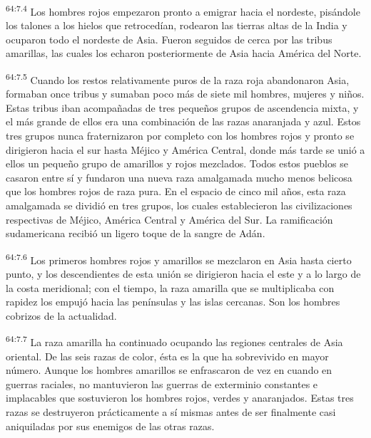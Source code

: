 \par
\textsuperscript{64:7.4} Los hombres rojos empezaron pronto a emigrar hacia el nordeste, pisándole los talones a los hielos que retrocedían, rodearon las tierras altas de la India y ocuparon todo el nordeste de Asia. Fueron seguidos de cerca por las tribus amarillas, las cuales los echaron posteriormente de Asia hacia América del Norte.

\par
\textsuperscript{64:7.5} Cuando los restos relativamente puros de la raza roja abandonaron Asia, formaban once tribus y sumaban poco más de siete mil hombres, mujeres y niños. Estas tribus iban acompañadas de tres pequeños grupos de ascendencia mixta, y el más grande de ellos era una combinación de las razas anaranjada y azul. Estos tres grupos nunca fraternizaron por completo con los hombres rojos y pronto se dirigieron hacia el sur hasta Méjico y América Central, donde más tarde se unió a ellos un pequeño grupo de amarillos y rojos mezclados. Todos estos pueblos se casaron entre sí y fundaron una nueva raza amalgamada mucho menos belicosa que los hombres rojos de raza pura. En el espacio de cinco mil años, esta raza amalgamada se dividió en tres grupos, los cuales establecieron las civilizaciones respectivas de Méjico, América Central y América del Sur. La ramificación sudamericana recibió un ligero toque de la sangre de Adán.

\par
\textsuperscript{64:7.6} Los primeros hombres rojos y amarillos se mezclaron en Asia hasta cierto punto, y los descendientes de esta unión se dirigieron hacia el este y a lo largo de la costa meridional; con el tiempo, la raza amarilla que se multiplicaba con rapidez los empujó hacia las penínsulas y las islas cercanas. Son los hombres cobrizos de la actualidad.

\par
\textsuperscript{64:7.7} La raza amarilla ha continuado ocupando las regiones centrales de Asia oriental. De las seis razas de color, ésta es la que ha sobrevivido en mayor número. Aunque los hombres amarillos se enfrascaron de vez en cuando en guerras raciales, no mantuvieron las guerras de exterminio constantes e implacables que sostuvieron los hombres rojos, verdes y anaranjados. Estas tres razas se destruyeron prácticamente a sí mismas antes de ser finalmente casi aniquiladas por sus enemigos de las otras razas.

